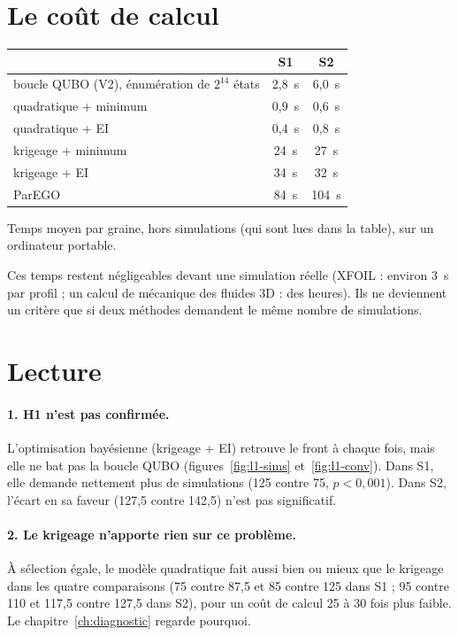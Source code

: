 \section{Le coût de calcul}
\begin{center}
\begin{tabular}{lcc}
\toprule
 & S1 & S2 \\
\midrule
boucle QUBO (V2), énumération de $2^{14}$ états & 2,8~s & 6,0~s \\
quadratique + minimum & 0,9~s & 0,6~s \\
quadratique + EI & 0,4~s & 0,8~s \\
krigeage + minimum & 24~s & 27~s \\
krigeage + EI & 34~s & 32~s \\
ParEGO & 84~s & 104~s \\
\bottomrule
\end{tabular}

\smallskip
{\footnotesize Temps moyen par graine, hors simulations (qui sont lues dans la table), sur un ordinateur portable.}
\end{center}
Ces temps restent négligeables devant une simulation réelle (XFOIL : environ 3~s par profil ; un calcul de mécanique des fluides 3D : des heures). Ils ne deviennent un critère que si deux méthodes demandent le même nombre de simulations.

\section{Lecture}
\paragraph{1. H1 n'est pas confirmée.} L'optimisation bayésienne (krigeage + EI) retrouve le front à chaque fois, mais elle ne bat pas la boucle QUBO (figures~\ref{fig:l1-sims} et~\ref{fig:l1-conv}). Dans S1, elle demande nettement plus de simulations (125 contre 75, $p<0{,}001$). Dans S2, l'écart en sa faveur (127,5 contre 142,5) n'est pas significatif.

\paragraph{2. Le krigeage n'apporte rien sur ce problème.} À sélection égale, le modèle quadratique fait aussi bien ou mieux que le krigeage dans les quatre comparaisons (75 contre 87,5 et 85 contre 125 dans S1 ; 95 contre 110 et 117,5 contre 127,5 dans S2), pour un coût de calcul 25 à 30 fois plus faible. Le chapitre~\ref{ch:diagnostic} regarde pourquoi.

